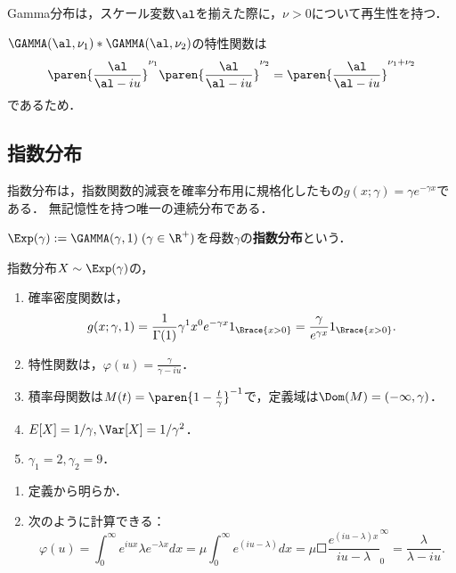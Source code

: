 \documentclass[uplatex,dvipdfmx]{jsreport}
\begin{document}
\begin{proposition}[Gamma分布の再生性]
    Gamma分布は，スケール変数$\al$を揃えた際に，$\nu>0$について再生性を持つ．
\end{proposition}
\begin{Proof}
    $\GAMMA(\al,\nu_1)*\GAMMA(\al,\nu_2)$の特性関数は
    \[\paren{\frac{\al}{\al-iu}}^{\nu_1}\paren{\frac{\al}{\al-iu}}^{\nu_2}=\paren{\frac{\al}{\al-iu}}^{\nu_1+\nu_2}\]
    であるため．
\end{Proof}

\subsection{指数分布}

\begin{tcolorbox}[colframe=ForestGreen, colback=ForestGreen!10!white,breakable,colbacktitle=ForestGreen!40!white,coltitle=black,fonttitle=\bfseries\sffamily,
title=]
    指数分布は，指数関数的減衰を確率分布用に規格化したもの$g(x;\gamma)=\gamma e^{-\gamma x}$である．
    無記憶性を持つ唯一の連続分布である．
\end{tcolorbox}

\begin{definition}\mbox{}\label{def-exponential-distribution}
    $\Exp(\gamma):=\GAMMA(\gamma,1)\;(\gamma\in\R^+)$を母数$\gamma$の\textbf{指数分布}という．
\end{definition}

\begin{proposition}[特性値]
    指数分布$X\sim\Exp(\gamma)$の，
    \begin{enumerate}
        \item 確率密度関数は，
        \[g(x;\gamma,1)=\frac{1}{\Gamma(1)}\gamma^1x^0e^{-\gamma x}1_{\Brace{x>0}}=\frac{\gamma}{e^{\gamma x}}1_{\Brace{x>0}}.\]
        \item 特性関数は，$\varphi(u)=\frac{\gamma}{\gamma-iu}$．
        \item 積率母関数は$M(t)=\paren{1-\frac{t}{\gamma}}^{-1}$で，定義域は$\Dom(M)=(-\infty,\gamma)$．
        \item $E[X]=1/\gamma,\Var[X]=1/\gamma^2$．
        \item $\gamma_1=2,\gamma_2=9$．
    \end{enumerate}
\end{proposition}
\begin{Proof}\mbox{}
    \begin{enumerate}
        \item 定義から明らか．
        \item 次のように計算できる：
        \[\varphi(u)=\int^\infty_0e^{iux}\lambda e^{-\lambda x}dx=\mu\int^\infty_0e^{(iu-\lambda)}dx=\mu\Square{\frac{e^{(iu-\lambda)x}}{iu-\lambda}}^\infty_0=\frac{\lambda}{\lambda-iu}.\]

    \end{enumerate}
\end{Proof}
\end{document}
